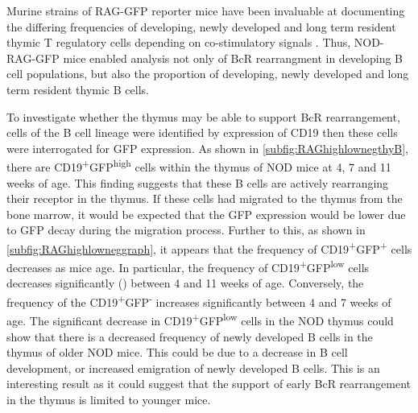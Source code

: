 Murine strains of RAG-GFP reporter mice have been invaluable at documenting the differing frequencies of developing, newly developed and long term resident thymic T regulatory cells depending on co-stimulatory signals .
Thus, NOD-RAG-GFP mice enabled analysis not only of BcR rearrangment in developing B cell populations, but also the proportion of developing, newly developed and long term resident thymic B cells.

To investigate whether the thymus may be able to support BcR rearrangement, cells of the B cell lineage were identified by expression of CD19 then these cells were interrogated for GFP expression.
As shown in \cref{subfig:RAGhighlownegthyB}, there are CD19\textsuperscript{+}GFP\textsuperscript{high} cells within the thymus of NOD mice at 4, 7 and 11 weeks of age.
This finding suggests that these B cells are actively rearranging their receptor in the thymus.
If these cells had migrated to the thymus from the bone marrow, it would be expected that the GFP expression would be lower due to GFP decay during the migration process.
Further to this, as shown in \cref{subfig:RAGhighlowneggraph}, it appears that the frequency of CD19\textsuperscript{+}GFP\textsuperscript{+} cells decreases as mice age.
In particular, the frequency of CD19\textsuperscript{+}GFP\textsuperscript{low} cells decreases significantly () between 4 and 11 weeks of age.
Conversely, the frequency of the CD19\textsuperscript{+}GFP\textsuperscript{-} increases significantly between 4 and 7 weeks of age.
The significant decrease in CD19\textsuperscript{+}GFP\textsuperscript{low} cells in the NOD thymus could show that there is a decreased frequency of newly developed B cells in the thymus of older NOD mice.
This could be due to a decrease in B cell development, or increased emigration of newly developed B cells.
This is an interesting result as it could suggest that the support of early BcR rearrangement in the thymus is limited to younger mice.



